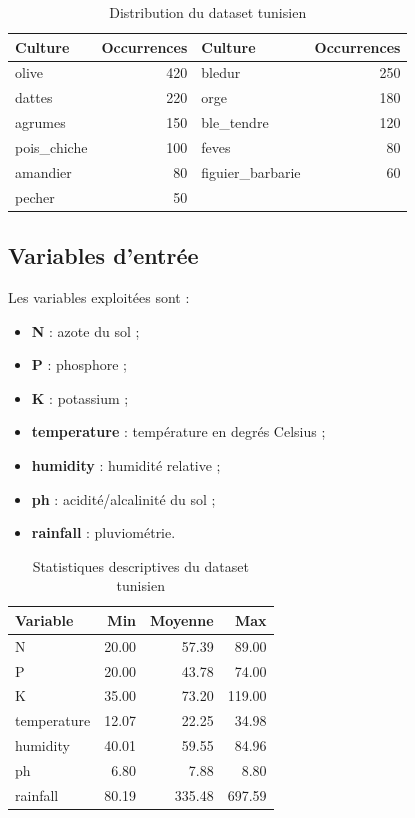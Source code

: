 \documentclass[12pt,a4paper]{report}
\begin{document}
\begin{table}[H]
\centering
\caption{Distribution du dataset tunisien}
\begin{tabular}{lrlr}
\toprule
\textbf{Culture} & \textbf{Occurrences} & \textbf{Culture} & \textbf{Occurrences} \\
\midrule
olive & 420 & bledur & 250 \\
dattes & 220 & orge & 180 \\
agrumes & 150 & ble\_tendre & 120 \\
pois\_chiche & 100 & feves & 80 \\
amandier & 80 & figuier\_barbarie & 60 \\
pecher & 50 & & \\
\bottomrule
\end{tabular}
\end{table}

\subsection{Variables d'entrée}
Les variables exploitées sont :
\begin{itemize}[noitemsep]
  \item \textbf{N} : azote du sol ;
  \item \textbf{P} : phosphore ;
  \item \textbf{K} : potassium ;
  \item \textbf{temperature} : température en degrés Celsius ;
  \item \textbf{humidity} : humidité relative ;
  \item \textbf{ph} : acidité/alcalinité du sol ;
  \item \textbf{rainfall} : pluviométrie.
\end{itemize}

\begin{table}[H]
\centering
\caption{Statistiques descriptives du dataset tunisien}
\begin{tabular}{lrrr}
\toprule
\textbf{Variable} & \textbf{Min} & \textbf{Moyenne} & \textbf{Max} \\
\midrule
N & 20.00 & 57.39 & 89.00 \\
P & 20.00 & 43.78 & 74.00 \\
K & 35.00 & 73.20 & 119.00 \\
temperature & 12.07 & 22.25 & 34.98 \\
humidity & 40.01 & 59.55 & 84.96 \\
ph & 6.80 & 7.88 & 8.80 \\
rainfall & 80.19 & 335.48 & 697.59 \\
\bottomrule
\end{tabular}
\end{table}
\end{document}
